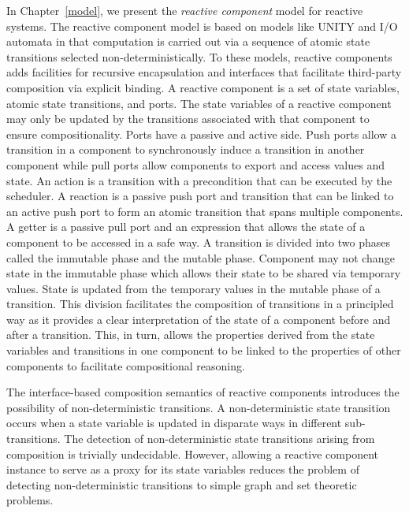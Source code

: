 In Chapter~\ref{model}, we present the \emph{reactive component} model for reactive systems.
The reactive component model is based on models like UNITY and I/O automata in that computation is carried out via a sequence of atomic state transitions selected non-deterministically.
To these models, reactive components adds facilities for recursive encapsulation and interfaces that facilitate third-party composition via explicit binding.
A reactive component is a set of state variables, atomic state transitions, and ports.
The state variables of a reactive component may only be updated by the transitions associated with that component to ensure compositionality.
Ports have a passive and active side.
Push ports allow a transition in a component to synchronously induce a transition in another component while pull ports allow components to export and access values and state.
An action is a transition with a precondition that can be executed by the scheduler.
A reaction is a passive push port and transition that can be linked to an active push port to form an atomic transition that spans multiple components.
A getter is a passive pull port and an expression that allows the state of a component to be accessed in a safe way.
A transition is divided into two phases called the immutable phase and the mutable phase.
Component may not change state in the immutable phase which allows their state to be shared via temporary values.
State is updated from the temporary values in the mutable phase of a transition.
This division facilitates the composition of transitions in a principled way as it provides a clear interpretation of the state of a component before and after a transition.
This, in turn, allows the properties derived from the state variables and transitions in one component to be linked to the properties of other components to facilitate compositional reasoning.

The interface-based composition semantics of reactive components introduces the possibility of non-deterministic transitions.
A non-deterministic state transition occurs when a state variable is updated in disparate ways in different sub-transitions.
The detection of non-deterministic state transitions arising from composition is trivially undecidable.
However, allowing a reactive component instance to serve as a proxy for its state variables reduces the problem of detecting non-deterministic transitions to simple graph and set theoretic problems.

